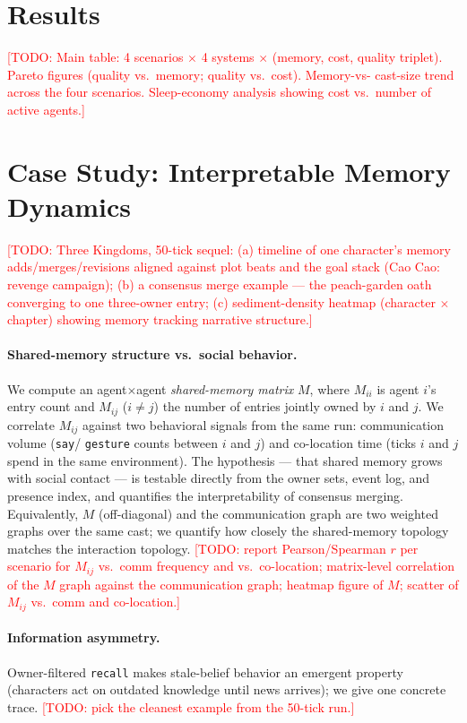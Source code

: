 \documentclass[11pt]{article}
\newcommand{\todo}[1]{\textcolor{red}{[TODO: #1]}}
\begin{document}
\section{Results}
\label{sec:results}
\todo{Main table: 4 scenarios $\times$ 4 systems $\times$ (memory, cost, quality
triplet). Pareto figures (quality vs.\ memory; quality vs.\ cost). Memory-vs-%
cast-size trend across the four scenarios. Sleep-economy analysis showing cost
vs.\ number of active agents.}

\section{Case Study: Interpretable Memory Dynamics}
\label{sec:case}
\todo{Three Kingdoms, 50-tick sequel: (a) timeline of one character's memory
adds/merges/revisions aligned against plot beats and the goal stack (Cao Cao:
revenge campaign); (b) a consensus merge example --- the peach-garden oath
converging to one three-owner entry; (c) sediment-density heatmap (character
$\times$ chapter) showing memory tracking narrative structure.}

\paragraph{Shared-memory structure vs.\ social behavior.}
We compute an agent$\times$agent \emph{shared-memory matrix} $M$, where
$M_{ii}$ is agent $i$'s entry count and $M_{ij}$ ($i\neq j$) the number of
entries jointly owned by $i$ and $j$. We correlate $M_{ij}$ against two
behavioral signals from the same run: communication volume (\texttt{say}/%
\texttt{gesture} counts between $i$ and $j$) and co-location time (ticks $i$
and $j$ spend in the same environment). The hypothesis --- that shared memory
grows with social contact --- is testable directly from the owner sets, event
log, and presence index, and quantifies the interpretability of consensus
merging. Equivalently, $M$ (off-diagonal) and the communication graph are two
weighted graphs over the same cast; we quantify how closely the shared-memory
topology matches the interaction topology. \todo{report Pearson/Spearman $r$ per
scenario for $M_{ij}$ vs.\ comm frequency and vs.\ co-location; matrix-level
correlation of the $M$ graph against the communication graph; heatmap figure of
$M$; scatter of $M_{ij}$ vs.\ comm and co-location.}

\paragraph{Information asymmetry.}
Owner-filtered \texttt{recall} makes stale-belief behavior an emergent property
(characters act on outdated knowledge until news arrives); we give one
concrete trace. \todo{pick the cleanest example from the 50-tick run.}
\end{document}
